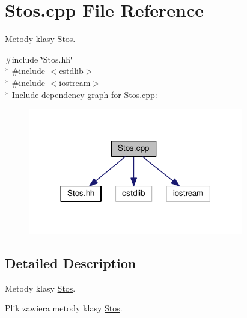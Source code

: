 \hypertarget{a00015}{}\section{Stos.\+cpp File Reference}
\label{a00015}


Metody klasy \hyperlink{a00005}{Stos}.  


{\ttfamily \#include \char`\"{}Stos.\+hh\char`\"{}}\\*
{\ttfamily \#include $<$cstdlib$>$}\\*
{\ttfamily \#include $<$iostream$>$}\\*
Include dependency graph for Stos.\+cpp\+:\nopagebreak
\begin{figure}[H]
\begin{center}
\leavevmode
\includegraphics[width=266pt]{a00029}
\end{center}
\end{figure}


\subsection{Detailed Description}
Metody klasy \hyperlink{a00005}{Stos}. 

Plik zawiera metody klasy \hyperlink{a00005}{Stos}. 